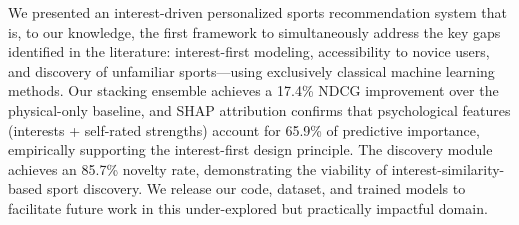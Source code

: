 \documentclass[conference]{IEEEtran}
\begin{document}
We presented an interest-driven personalized sports recommendation system
that is, to our knowledge, the first framework to simultaneously address
the key gaps identified in the literature: interest-first modeling,
accessibility to novice users, and discovery of unfamiliar sports---using
exclusively classical machine learning methods.
Our stacking ensemble achieves a 17.4\% NDCG improvement over
the physical-only baseline, and SHAP attribution confirms that
psychological features (interests + self-rated strengths) account for
65.9\% of predictive importance, empirically supporting the interest-first
design principle.
The discovery module achieves an 85.7\% novelty rate, demonstrating
the viability of interest-similarity-based sport discovery.
We release our code, dataset, and trained models to
facilitate future work in this under-explored but practically impactful domain.



\end{document}

